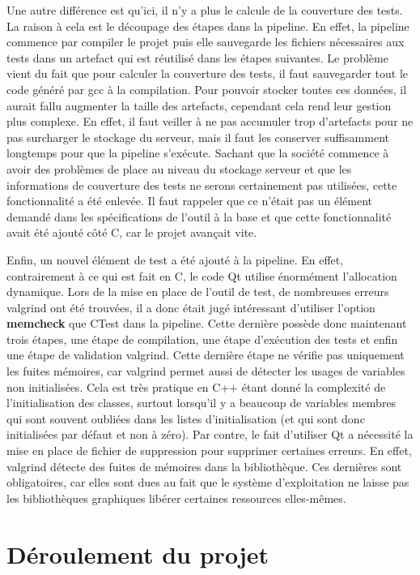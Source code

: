\documentclass[a4paper]{article}
\begin{document}
Une autre différence est qu'ici, il n'y a plus le calcule de la couverture des
tests. La raison à cela est le découpage des étapes dans la pipeline. En effet,
la pipeline commence par compiler le projet puis elle sauvegarde les fichiers
nécessaires aux tests dans un artefact qui est réutilisé dans les étapes
suivantes. Le problème vient du fait que pour calculer la couverture des tests,
il faut sauvegarder tout le code généré par gcc à la compilation. Pour pouvoir
stocker toutes ces données, il aurait fallu augmenter la taille des artefacts,
cependant cela rend leur gestion plus complexe. En effet, il faut veiller à ne
pas accumuler trop d'artefacts pour ne pas surcharger le stockage du serveur,
mais il faut les conserver suffisamment longtemps pour que la pipeline
s'exécute. Sachant que la société commence à avoir des problèmes de place au
niveau du stockage serveur et que les informations de couverture des tests ne
serons certainement pas utilisées, cette fonctionnalité a été enlevée. Il faut
rappeler que ce n'était pas un élément demandé dans les spécifications de l'outil
à la base et que cette fonctionnalité avait été ajouté côté C, car le projet
avançait vite.

Enfin, un nouvel élément de test a été ajouté à la pipeline. En effet,
contrairement à ce qui est fait en C, le code Qt utilise énormément l'allocation
dynamique. Lors de la mise en place de l'outil de test, de nombreuses erreurs
valgrind ont été trouvées, il a donc était jugé intéressant d'utiliser
l'option \textbf{memcheck} que CTest dans la pipeline. Cette dernière possède
donc maintenant trois étapes, une étape de compilation, une étape d'exécution des
tests et enfin une étape de validation valgrind. Cette dernière étape ne vérifie
pas uniquement les fuites mémoires, car valgrind permet aussi de détecter les
usages de variables non initialisées. Cela est très pratique en C++ étant donné
la complexité de l'initialisation des classes, surtout lorsqu'il y a beaucoup de
variables membres qui sont souvent oubliées dans les listes d'initialisation (et
qui sont donc initialisées par défaut et non à zéro). Par contre, le fait
d'utiliser Qt a nécessité la mise en place de fichier de suppression pour
supprimer certaines erreurs. En effet, valgrind détecte des fuites de mémoires
dans la bibliothèque. Ces dernières sont obligatoires, car elles sont dues au fait
que le système d'exploitation ne laisse pas les bibliothèques graphiques libérer
certaines ressources elles-mêmes.
\section{Déroulement du projet}%
\end{document}
